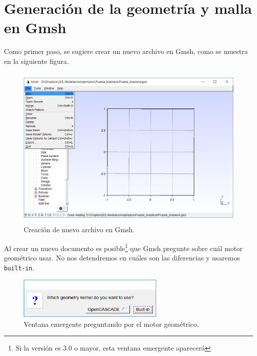\documentclass[12pt,letterpaper]{article}
\begin{document}
\section{Generación de la geometría y malla en Gmsh}
Como primer paso, se sugiere crear un nuevo archivo en Gmsh, como se muestra en la siguiente figura.
\begin{figure}[H]
    \centering
    \includegraphics[height=8cm]{img/Nuevo_archivo.png} 
    \caption{Creación de nuevo archivo en Gmsh.}
\end{figure}

Al crear un nuevo documento es posible\footnote{Si la versión es 3.0 o mayor, esta ventana emergente aparecerá} que Gmsh pregunte sobre cuál motor geométrico usar. No nos detendremos en cuáles son las diferencias y usaremos \texttt{built-in}.
\begin{figure}[H]
    \centering
    \includegraphics[height=2cm]{img/Motor_geometrico.png} 
    \caption{Ventana emergente preguntando por el motor geométrico.}
\end{figure}
\end{document}
